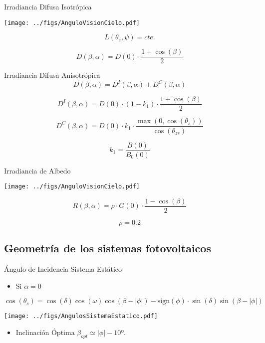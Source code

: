 \documentclass[xcolor={usenames,svgnames,dvipsnames}]{beamer}
\begin{document}
\begin{frame}[label={sec:org9b613f5}]{Irradiancia Difusa Isotrópica}
\begin{center}
\texttt{[image: ../figs/AnguloVisionCielo.pdf]}
\end{center}


\[L(\theta_{z},\psi)=cte.\]

\[D(\beta,\alpha)=D(0)\cdot\frac{1+\cos(\beta)}{2}\]
\end{frame}
\begin{frame}[label={sec:org1b5c98f}]{Irradiancia Difusa Anisotrópica}
\[D(\beta,\alpha) = D^{I}(\beta,\alpha)+D^{C}(\beta,\alpha)\]

\[D^{I}(\beta,\alpha) = D(0) \cdot (1-k_{1}) \cdot \frac{1 + \cos(\beta)}{2}\]

\[D^{C}(\beta,\alpha) = D(0) \cdot k_{1} \cdot \frac{\max(0,\cos(\theta_{s}))}{\cos(\theta_{zs})}\]

\[k_{1} = \frac{B(0)}{B_{0}(0)}\]
\end{frame}

\begin{frame}[label={sec:org719edd7}]{Irradiancia de Albedo}
\begin{center}
\texttt{[image: ../figs/AnguloVisionCielo.pdf]}
\end{center}


\[R(\beta,\alpha)=\rho\cdot G(0)\cdot\frac{1-\cos(\beta)}{2}\]

\[\rho=0.2\]
\end{frame}

\subsection{Geometría de los sistemas fotovoltaicos}
\label{sec:org3978d5a}
\begin{frame}[label={sec:org27c9bd3},plain]{Ángulo de Incidencia Sistema Estático}
\begin{itemize}
\item Si \(\alpha=0\)
\end{itemize}
\[
\cos(\theta_{s}) = \cos(\delta)\cos(\omega)\cos(\beta-|\phi|)- \mathrm{sign}(\phi)\cdot\sin(\delta)\sin(\beta-|\phi|)
\]

\begin{center}
\texttt{[image: ../figs/AngulosSistemaEstatico.pdf]}
\end{center}

\begin{itemize}
\item Inclinación Óptima \(\beta_{opt} \simeq |\phi| - 10º\).
\end{itemize}
\end{frame}
\end{document}
